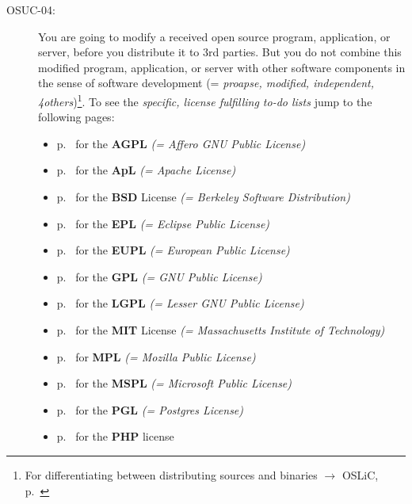 \begin{description}
\item[OSUC-04:]\label{OSUC-04-DEF} You are going to modify a received open
source program, application, or server, before you distribute it to 3rd parties.
But you do not combine this modified program, application, or server with other
software components in the sense of software development (= \textit{proapse,
modified, independent, 4others})\footnote{For differentiating between
distributing sources and binaries $\rightarrow$ OSLiC, p.\
\pageref{sec:SourceBinaryDifference}}.
To see the \textit{specific, license fulfilling to-do lists} jump to the
following pages:
  \begin{itemize}
    \item p.\ \pageref{OSUC-04-AGPL} for the \textbf{AGPL}
      \textit{(= Affero GNU Public License)} 
    \item p.\ \pageref{OSUC-04-Apache20} for the \textbf{ApL}
      \textit{(= Apache License)}
    \item p.\ \pageref{OSUC-04-BSD} for the \textbf{BSD} License
      \textit{(= Berkeley Software Distribution)}
    \item p.\ \pageref{OSUC-04-EPL} for the \textbf{EPL}
      \textit{(= Eclipse Public License)}     
    \item p.\ \pageref{OSUC-04-EUPL} for the \textbf{EUPL}
      \textit{(= European Public License)} 
    \item p.\ \pageref{OSUC-04-GPL} for the \textbf{GPL}
       \textit{(= GNU Public License)} 
    \item p.\ \pageref{OSUC-04-LGPL} for the \textbf{LGPL}
      \textit{(= Lesser GNU Public License)}           
    \item p.\ \pageref{OSUC-04-MIT} for the \textbf{MIT} License
       \textit{(= Massachusetts Institute of Technology)} 
    \item p.\ \pageref{OSUC-04-MPL} for \textbf{MPL}
      \textit{(= Mozilla Public License)}     
    \item p.\ \pageref{OSUC-04-MsPL} for the \textbf{MSPL}
      \textit{(= Microsoft Public License)} 
    \item p.\ \pageref{OSUC-04-PGL} for the \textbf{PGL}
      \textit{(= Postgres License)} 
    \item p.\ \pageref{OSUC-04-PHP} for the \textbf{PHP} license 
  \end{itemize}


\end{description}
